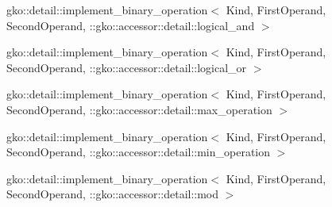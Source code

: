 \begin{DoxyCompactList}
\begin{DoxyCompactList}
\item {}
\end{DoxyCompactList}
\item gko\+:\+:detail\+:\+:implement\+\_\+binary\+\_\+operation$<$ Kind, First\+Operand, Second\+Operand, \+:\+:gko\+:\+:accessor\+:\+:detail\+:\+:logical\+\_\+and $>$\begin{DoxyCompactList}
\item {}
\end{DoxyCompactList}
\item gko\+:\+:detail\+:\+:implement\+\_\+binary\+\_\+operation$<$ Kind, First\+Operand, Second\+Operand, \+:\+:gko\+:\+:accessor\+:\+:detail\+:\+:logical\+\_\+or $>$\begin{DoxyCompactList}
\item {}
\end{DoxyCompactList}
\item gko\+:\+:detail\+:\+:implement\+\_\+binary\+\_\+operation$<$ Kind, First\+Operand, Second\+Operand, \+:\+:gko\+:\+:accessor\+:\+:detail\+:\+:max\+\_\+operation $>$\begin{DoxyCompactList}
\item {}
\end{DoxyCompactList}
\item gko\+:\+:detail\+:\+:implement\+\_\+binary\+\_\+operation$<$ Kind, First\+Operand, Second\+Operand, \+:\+:gko\+:\+:accessor\+:\+:detail\+:\+:min\+\_\+operation $>$\begin{DoxyCompactList}
\item {}
\end{DoxyCompactList}
\item gko\+:\+:detail\+:\+:implement\+\_\+binary\+\_\+operation$<$ Kind, First\+Operand, Second\+Operand, \+:\+:gko\+:\+:accessor\+:\+:detail\+:\+:mod $>$\begin{DoxyCompactList}

\end{DoxyCompactList}
\end{DoxyCompactList}
